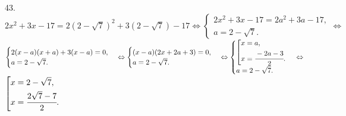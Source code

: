 43. $2x^2+3x-17=2(2-\sqrt{7})^2+3(2-\sqrt{7})-17\Leftrightarrow\begin{cases}2x^2+3x-17=2a^2+3a-17,\\ a=2-\sqrt{7}.\end{cases}
\Leftrightarrow$\\$\begin{cases}2(x-a)(x+a)+3(x-a)=0,\\ a=2-\sqrt{7}.\end{cases}
\Leftrightarrow\begin{cases}(x-a)(2x+2a+3)=0,\\ a=2-\sqrt{7}.\end{cases}
\Leftrightarrow \begin{cases}\left[\begin{gathered}
     x=a,\hfill\\
     x=\cfrac{-2a-3}{2}.\hfill \end{gathered}\right.\\ a=2-\sqrt{7}.\end{cases}\Leftrightarrow$\\$
\left[\begin{gathered}
     x=2-\sqrt{7},\hfill\\
     x=\cfrac{2\sqrt{7}-7}{2}.\hfill \end{gathered}\right.$\\
